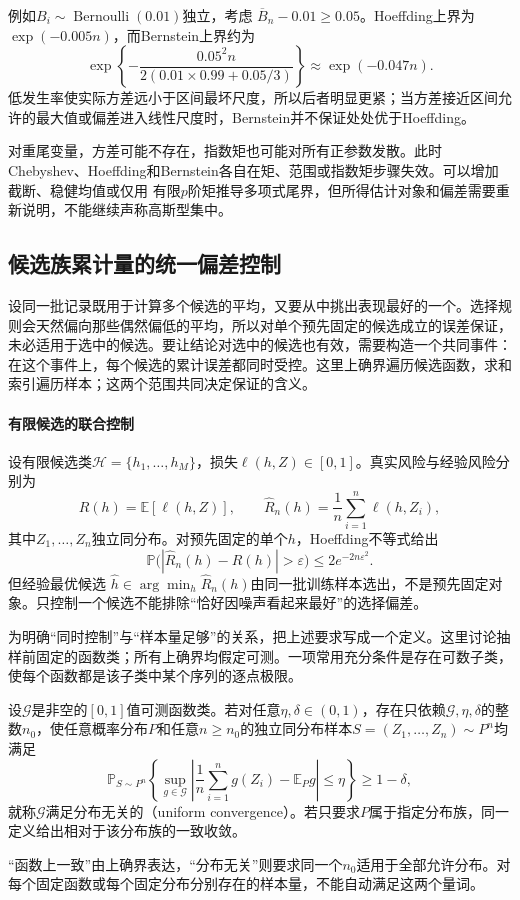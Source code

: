 例如\(B_i\sim\operatorname{Bernoulli}(0.01)\)独立，考虑
\(\overline{B}_n-0.01\geq0.05\)。Hoeffding上界为
\(\exp(-0.005n)\)，而Bernstein上界约为
\[
  \exp\left\{
    -\frac{0.05^2n}
      {2(0.01\times0.99+0.05/3)}
  \right\}
  \approx \exp(-0.047n).
\]
低发生率使实际方差远小于区间最坏尺度，所以后者明显更紧；当方差接近区间允许的最大值或偏差进入线性尺度时，Bernstein并不保证处处优于Hoeffding。

对重尾变量，方差可能不存在，指数矩也可能对所有正参数发散。此时Chebyshev、Hoeffding和Bernstein各自在矩、范围或指数矩步骤失效。可以增加截断、稳健均值或仅用
有限\(p\)阶矩推导多项式尾界，但所得估计对象和偏差需要重新说明，不能继续声称高斯型集中。

\subsection{候选族累计量的统一偏差控制}
\label{sec:probability-uniform-errors-symmetry}
\label{sec:probability-random-functions-uniform-error}
设同一批记录既用于计算多个候选的平均，又要从中挑出表现最好的一个。选择规则会天然偏向那些偶然偏低的平均，所以对单个预先固定的候选成立的误差保证，未必适用于选中的候选。要让结论对选中的候选也有效，需要构造一个共同事件：在这个事件上，每个候选的累计误差都同时受控。这里上确界遍历候选函数，求和索引遍历样本；这两个范围共同决定保证的含义。

\paragraph{有限候选的联合控制}
设有限候选类\(\mathcal{H}=\{h_1,\ldots,h_M\}\)，损失\(\ell(h,Z)\in[0,1]\)。真实风险与经验风险分别为
\[ R(h)=\mathbb{E}[\ell(h,Z)],
  \qquad\widehat{R}_n(h)=\frac{1}{n}\sum_{i=1}^{n}\ell(h,Z_i), \]
其中\(Z_1,\ldots,Z_n\)独立同分布。对预先固定的单个\(h\)，Hoeffding不等式给出
\[ \mathbb{P}\bigl(
    |\widehat{R}_n(h)-R(h)|>\varepsilon\bigr)\leq 2e^{-2n\varepsilon^2}. \]
但经验最优候选
\(\widehat{h}\in\arg\min_h\widehat{R}_n(h)\)由同一批训练样本选出，不是预先固定对象。只控制一个候选不能排除“恰好因噪声看起来最好”的选择偏差。

为明确“同时控制”与“样本量足够”的关系，把上述要求写成一个定义。这里讨论抽样前固定的函数类；所有上确界均假定可测。一项常用充分条件是存在可数子类，使每个函数都是该子类中某个序列的逐点极限。
\begin{definition}[分布无关的一致收敛]
  \label{def:uniform-convergence}
  设\(\mathcal G\)是非空的\([0,1]\)值可测函数类。若对任意\(\eta,\delta\in(0,1)\)，存在只依赖\(\mathcal G,\eta,\delta\)的整数\(n_0\)，使任意概率分布\(P\)和任意\(n\geq n_0\)的独立同分布样本\(S=(Z_1,\ldots,Z_n)\sim P^n\)均满足
  \begin{equation}
    \mathbb P_{S\sim P^n}\left\{
      \sup_{g\in\mathcal G}\left|\frac1n\sum_{i=1}^ng(Z_i)-\mathbb E_Pg\right|\leq\eta
    \right\}\geq1-\delta,
    \label{eq:uniform-convergence-definition}
  \end{equation}
  就称\(\mathcal G\)满足分布无关的（uniform convergence）。若只要求\(P\)属于指定分布族，同一定义给出相对于该分布族的一致收敛。
\end{definition}
“函数上一致”由上确界表达，“分布无关”则要求同一个\(n_0\)适用于全部允许分布。对每个固定函数或每个固定分布分别存在的样本量，不能自动满足这两个量词。

